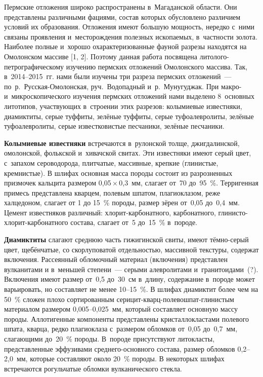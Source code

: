 




\makeProcTitleII
{}

\vspace{-10pt}
Пермские отложения широко распространены в~Магаданской области. Они представлены различными фациями, состав которых обусловлено различием условий их образования. Отложения имеют большую мощность, нередко с~ними связаны проявления и~месторождения полезных ископаемых, в~частности золота. Наиболее полные и~хорошо охарактеризованные фауной разрезы находятся на Омолонском массиве [1, 2]. Поэтому данная работа посвящена литолого-петрографическому изучению пермских отложений Омолонского массива. Так, в~2014--2015~гг. нами были изучены три разреза пермских отложений~--- по~р.~Русская-Омолонская, руч.~Водопадный и~р.~Мунугуджак. При макро- и~микроскопического изучения пермских отложений нами выделено 8~основных литотипов, участвующих в~строении этих разрезов: колымиевые известняки, диамиктиты, серые туффиты, зелёные туффиты, серые туфоалевролиты, зелёные туфоалевролиты, серые известковистые песчаники, зелёные песчаники.

\textbf{Колымиевые известняки} встречаются в~рулонской толще, джигдалинской, омолонской, фолькской и~хивачской свитах. Эти известняки имеют серый цвет, с~запахом сероводорода, плитчатые, массивные, крепкие (глинистые, кремнистые). В шлифах основная масса породы состоит из разрозненных призмочек кальцита размером 0,05\,$\times$\,0,3~мм, слагает от~70 до~95~\%. Терригенная примесь представлена кварцем, полевым шпатом, плагиоклазом, реже халцедоном, слагает от 1 до 15~\% породы, размер зёрен от~0,05 до~0,4~мм. Цемент известняков различный: хлорит-карбонатного, карбонатного, глинисто-хлорит-карбонатного состава, слагает от~5 до~15~\% в~породе.

\textbf{Диамиктиты} слагают среднюю часть гижигинской свиты, имеют тёмно-серый цвет, щебёнчатые, со скорлуповатой отдельностью, массивной текстуры, содержат включения. Рассеянный обломочный материал (включения) представлен вулканитами и в~меньшей степени~--- серыми алевролитами и~гранитоидами~(?). Включения имеют размер от~0,5 до~30~см в~длину, содержание в~породе может варьировать, но составляет не менее 10--15~\%. В шлифах диамиктит более чем на 50~\% сложен плохо сортированным серицит-кварц-полевошпат-глинистым материалом размером 0,005--0,025~мм, который составляет основную массу породы. Аллотигенные компоненты представлены кристаллокластами полевого шпата, кварца, редко плагиоклаза с~размером обломков от~0,05 до~0,7~мм, слагающими до~20~\% породы. В~породе присутствуют литокласты, представленные эффузивами среднего-основного состава, размер обломков 0,2--2,0~мм, которые составляют около 20~\% породы. В некоторых шлифах встречаются рогульчатые обломки вулканического стекла.

